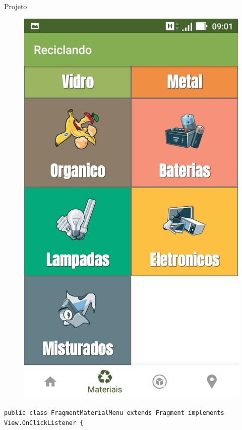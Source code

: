 \documentclass[
	12pt,				%
	openright,			%
	twoside,			%
	a4paper,			%
	english,			%
	french,				%
	spanish,			%
	brazil				%
	]{abntex2}
\begin{document}
\begin{chapter}{Projeto}
\begin{figure}[htb]
\begin{minipage}{0.45\textwidth}
    \includegraphics[scale=0.35]{media/tela_menu_material_2.jpg}
     \label{fig:tela_menu_material_2}
  \end{minipage}
\end{figure}

\newpage
\begin{lstlisting}[numbers=none,
basicstyle=\small,
caption={FragmentMaterialMenu.java},
title={FragmentMaterialMenu.java},
label={FragmentMaterialMenu.java}]
public class FragmentMaterialMenu extends Fragment implements View.OnClickListener {


\end{lstlisting}
\end{chapter}
\end{document}
